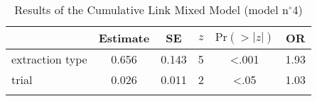 \begin{table}
\begin{tabular}{l S[table-format=1.3] S[table-format=1.3] c S[table-format=<1.3] S[table-format=1.2]}
\lsptoprule
     & {Estimate} & {SE} & {$z$} & {$\text{Pr}(>|z|)$} & {OR}\\ 
\midrule
extraction type & 0.656 & 0.143 & 5 & <.001 & 1.93 \\ 
trial           & 0.026 & 0.011 & 2 & <.05 & 1.03 \\ 
\lspbottomrule
\end{tabular}
\caption{Results of the Cumulative Link Mixed Model (model n$^{\circ}$4)}
\label{tab:exp13-m4}
\end{table}
